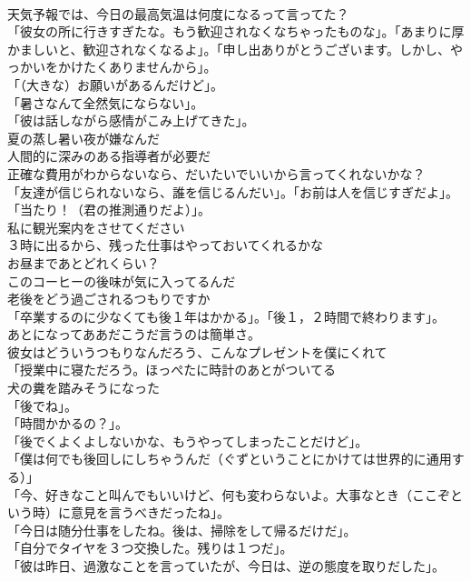 \documentclass[8pt]{extreport}
\begin{document}
\begin{CJK}{UTF8}{min}
\\	天気予報では、今日の最高気温は何度になるって言ってた？	
\\	「彼女の所に行きすぎたな。もう歓迎されなくなちゃったものな」。「あまりに厚かましいと、歓迎されなくなるよ」。「申し出ありがとうございます。しかし、やっかいをかけたくありませんから」。	
\\	「（大きな）お願いがあるんだけど」。	
\\	「暑さなんて全然気にならない」。	
\\	「彼は話しながら感情がこみ上げてきた」。	
\\	夏の蒸し暑い夜が嫌なんだ	
\\	人間的に深みのある指導者が必要だ	
\\	正確な費用がわからないなら、だいたいでいいから言ってくれないかな？	
\\	「友達が信じられないなら、誰を信じるんだい」。「お前は人を信じすぎだよ」。	
\\	「当たり！（君の推測通りだよ）」。	
\\	私に観光案内をさせてください	
\\	３時に出るから、残った仕事はやっておいてくれるかな	
\\	お昼まであとどれくらい？	
\\	このコーヒーの後味が気に入ってるんだ	
\\	老後をどう過ごされるつもりですか	
\\	「卒業するのに少なくても後１年はかかる」。「後１，２時間で終わります」。	
\\	あとになってああだこうだ言うのは簡単さ。	
\\	彼女はどういうつもりなんだろう、こんなプレゼントを僕にくれて	
\\	「授業中に寝ただろう。ほっぺたに時計のあとがついてる	
\\	犬の糞を踏みそうになった	
\\	「後でね」。	
\\	「時間かかるの？」。	
\\	「後でくよくよしないかな、もうやってしまったことだけど」。	
\\	「僕は何でも後回しにしちゃうんだ（ぐずということにかけては世界的に通用する）」	
\\	「今、好きなこと叫んでもいいけど、何も変わらないよ。大事なとき（ここぞという時）に意見を言うべきだったね」。	
\\	「今日は随分仕事をしたね。後は、掃除をして帰るだけだ」。	
\\	「自分でタイヤを３つ交換した。残りは１つだ」。	
\\	「彼は昨日、過激なことを言っていたが、今日は、逆の態度を取りだした」。	

\end{CJK}
\end{document}
